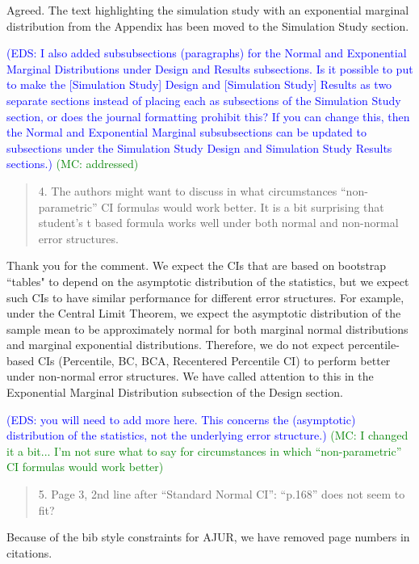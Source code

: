 \documentclass[12pt]{article}
\newcommand{\eds}[1]{\textcolor{blue}{(EDS: #1)}}
\newcommand{\mc}[1]{\textcolor{green}{(MC: #1)}}
\newenvironment{comment}%
{\begin{quotation}\noindent\small\it\color{darkblue}\ignorespaces%
}{\end{quotation}}
\begin{document}
Agreed. The text highlighting the simulation study with an exponential marginal
distribution from the Appendix has been moved to the Simulation Study 
section. 

\eds{I also added subsubsections (paragraphs) for the Normal and Exponential 
Marginal Distributions under Design and Results subsections.
Is it possible to put to make the [Simulation Study] Design and 
[Simulation Study] Results as two separate 
sections instead of placing each as subsections of the Simulation Study section,
or does the journal formatting prohibit this?  If you can change this, then the 
Normal and Exponential Marginal subsubsections can be updated to subsections
under the Simulation Study Design and Simulation Study Results sections.}  
\mc{addressed}


\begin{comment}
4. The authors might want to discuss in what circumstances “non-parametric” CI 
formulas would work better. It is a bit surprising that student’s t based 
formula works well under both normal and non-normal error structures.
\end{comment}

Thank you for the comment. We expect the CIs that 
are based on bootstrap ``tables" to depend on the 
asymptotic distribution of the statistics, but we expect such CIs to 
have similar performance for different error structures. For example, under the 
Central
Limit Theorem, we expect the asymptotic distribution of the sample mean to be 
approximately 
normal for both marginal normal distributions and marginal exponential 
distributions. Therefore, we do not expect percentile-based CIs (Percentile, BC, BCA, Recentered Percentile CI) to perform better 
under
non-normal error structures. We have called attention to this in the Exponential
Marginal Distribution subsection of the Design section.

\eds{you will need to add more here.  This concerns the
(asymptotic) distribution of the statistics, not the underlying error 
structure.}
\mc{I changed it a bit... I'm not sure what to say for circumstances in which
“non-parametric” CI 
formulas would work better}


\begin{comment}
5. Page 3, 2nd line after “Standard Normal CI”: “p.168” does not seem to fit?
\end{comment}

Because of the bib style constraints for AJUR, we have removed page numbers in 
citations.
\end{document}
